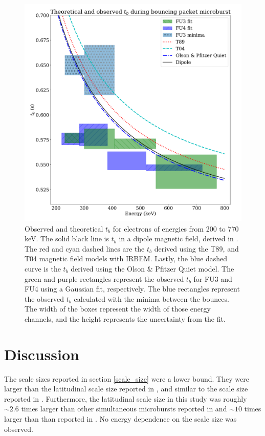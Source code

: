 \documentclass[draft,linenumbers]{agujournal}
\begin{document}
\begin{figure}
\includegraphics[width=\textwidth]{detrended_bounce_period_boxed_adj.pdf}
\caption{Observed and theoretical $t_b$ for electrons of energies from 200 to 770 keV. The solid black line is $t_b$ in a dipole magnetic field, derived in \citet{Schulz1974}. The red and cyan dashed lines are the $t_b$ derived using the T89, and T04 magnetic field models with IRBEM. Lastly, the blue dashed curve is the $t_b$ derived using the Olson \& Pfitzer Quiet model. The green and purple rectangles represent the observed $t_b$ for FU3 and FU4 using a Gaussian fit, respectively. The blue rectangles represent the observed $t_b$ calculated with the minima between the bounces. The width of the boxes represent the width of those energy channels, and the height represents the uncertainty from the fit.}
\label{tb_plot}
\end{figure}

\section{Discussion} \label{discussion}
The scale sizes reported in section \ref{scale_size} were a lower bound. They were larger than the latitudinal scale size reported in \citet{Blake1996}, and similar to the scale size reported in \citet{Parks1967}. Furthermore, the latitudinal scale size in this study was roughly $\sim 2.6$ times larger than other simultaneous microbursts reported in \citet{Crew2016} and $\sim 10$ times larger than than reported in \citet{Dietrich2010}. No energy dependence on the scale size was observed.
\end{document}

